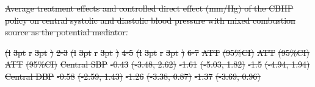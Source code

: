 \documentclass[
  letterpaper,
  DIV=11,
  numbers=noendperiod]{scrartcl}
\makeatletter
\renewenvironment{table}%
   {\renewcommand\familydefault\sfdefault
    \@float{table}}
   {\end@float}
\providecommand{\DIFdel}[1]{{\protect\color{red}\sout{#1}}}                      %
\providecommand{\DIFdelbegin}{} %
\providecommand{\DIFdelFL}[1]{\DIFdel{#1}} %
\providecommand{\DIFaddbeginFL}{} %
\providecommand{\DIFaddendFL}{} %
\providecommand{\DIFdelbeginFL}{} %
\providecommand{\DIFdelendFL}{} %
\newcommand{\DIFscaledelfig}{0.5}
\newlength{\DIFdelgraphicswidth} %
\newlength{\DIFdelgraphicsheight} %
\newcommand{\DIFaddincludegraphics}[2][]{{\color{blue}\fbox{\DIFOincludegraphics[#1]{#2}}}} %
\newcommand{\DIFdelincludegraphics}[2][]{%
\sbox{\DIFdelgraphicsbox}{\DIFOincludegraphics[#1]{#2}}%
\settoboxwidth{\DIFdelgraphicswidth}{\DIFdelgraphicsbox} %
\settoboxtotalheight{\DIFdelgraphicsheight}{\DIFdelgraphicsbox} %
\scalebox{\DIFscaledelfig}{%
\parbox[b]{\DIFdelgraphicswidth}{\usebox{\DIFdelgraphicsbox}\\[-\baselineskip] \rule{\DIFdelgraphicswidth}{0em}}\llap{\resizebox{\DIFdelgraphicswidth}{\DIFdelgraphicsheight}{%
\setlength{\unitlength}{\DIFdelgraphicswidth}%
\begin{picture}(1,1)%
\thicklines\linethickness{2pt} %
{\color[rgb]{1,0,0}\put(0,0){\framebox(1,1){}}}%
{\color[rgb]{1,0,0}\put(0,0){\line( 1,1){1}}}%
{\color[rgb]{1,0,0}\put(0,1){\line(1,-1){1}}}%
\end{picture}%
}\hspace*{3pt}}} %
} %
\DeclareRobustCommand{\DIFdelbegin}{\DIFOdelbegin \let\includegraphics\DIFdelincludegraphics} %
\DeclareRobustCommand{\DIFaddbeginFL}{\DIFOaddbeginFL \let\includegraphics\DIFaddincludegraphics} %
\DeclareRobustCommand{\DIFaddendFL}{\DIFOaddendFL \let\includegraphics\DIFOincludegraphics} %
\DeclareRobustCommand{\DIFdelbeginFL}{\DIFOdelbeginFL \let\includegraphics\DIFdelincludegraphics} %
\DeclareRobustCommand{\DIFdelendFL}{\DIFOaddendFL \let\includegraphics\DIFOincludegraphics} %
\makeatother
\begin{document}
\DIFdelbegin %
{%
\DIFdelFL{Average treatment effects and controlled direct effect (mm/Hg) of the
CBHP policy on central systolic and diastolic blood pressure with mixed
combustion source as the potential mediator. }}%
\DIFdelendFL \DIFaddbeginFL \begin{table}
\DIFaddendFL 

\DIFdelbeginFL %
\DIFdelFL{(l}%
\DIFdelFL{3pt}%
\DIFdelFL{r}%
\DIFdelFL{3pt}%
\DIFdelFL{)}%
\DIFdelFL{2-3}%
\DIFdelFL{(l}%
\DIFdelFL{3pt}%
\DIFdelFL{r}%
\DIFdelFL{3pt}%
\DIFdelFL{)}%
\DIFdelFL{4-5}%
\DIFdelFL{(l}%
\DIFdelFL{3pt}%
\DIFdelFL{r}%
\DIFdelFL{3pt}%
\DIFdelFL{)}%
\DIFdelFL{6-7}%
\DIFdelFL{ATT }%
\DIFdelFL{(95\%CI) }%
\DIFdelFL{ATT }%
\DIFdelFL{(95\%CI) }%
\DIFdelFL{ATT }%
\DIFdelFL{(95\%CI)}%
\DIFdelFL{Central SBP }%
\DIFdelFL{-0.43 }%
\DIFdelFL{(-3.48, 2.62) }%
\DIFdelFL{-1.61 }%
\DIFdelFL{(-5.03, 1.82) }%
\DIFdelFL{-1.5 }%
\DIFdelFL{(-4.94, 1.94)}%
\DIFdelFL{Central DBP }%
\DIFdelFL{-0.58 }%
\DIFdelFL{(-2.59, 1.43) }%
\DIFdelFL{-1.26 }%
\DIFdelFL{(-3.38, 0.87) }%
\DIFdelFL{-1.37 }%
\DIFdelFL{(-3.69, 0.96)}%

\end{table}
\end{document}
